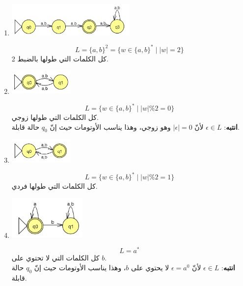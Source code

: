 \documentclass[12pt]{article}
\begin{document}
\begin{enumerate}[itemsep=3em]
\begin{enumerate}
\item
\includegraphics[width=0.5\textwidth]{../../../images/DFAs/ex1_q4.png}\\
\ifwithsols
\begin{solution}
\[ L = \{a, b\}^2 = \{ w \in \{a,b\}^* \mid |w|=2 \} \]
كل الكلمات التي طولها بالضبط 2.
\end{solution}
\fi

\item
\includegraphics[width=0.25\textwidth]{../../../images/DFAs/ex1_q5.png}\\
\ifwithsols
\begin{solution}
\[ L = \{ w \in \{a,b\}^* \mid |w| \% 2 = 0 \} \]
كل الكلمات التي طولها زوجي. \\
\textbf{انتبه}: $\epsilon \in L$ لأنّ $|\epsilon|=0$ وهو زوجي، وهذا يناسب الأوتومات حيث إنّ $q_0$ حالة قابلة.
\end{solution}
\fi

\item
\includegraphics[width=0.25\textwidth]{../../../images/DFAs/ex1_q6.png}\\
\ifwithsols
\begin{solution}
\[ L = \{ w \in \{a,b\}^* \mid |w| \% 2 = 1 \} \]
كل الكلمات التي طولها فردي.
\end{solution}
\fi

\item
\includegraphics[width=0.3\textwidth]{../../../images/DFAs/ex1_q7.png}\\
\ifwithsols
\begin{solution}
\[ L = a^* \]
كل الكلمات التي لا تحتوي على $b$. \\
\textbf{انتبه}: $\epsilon \in L$ لأنّ $\epsilon = a^0$ لا يحتوي على $b$، وهذا يناسب الأوتومات حيث إنّ $q_0$ حالة قابلة.
\end{solution}
\fi


\end{enumerate}
\end{enumerate}
\end{document}
